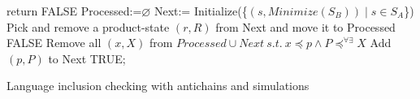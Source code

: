 \begin{algorithm}[H]
	\label{algAntichain}
			{return FALSE\;}
		Processed:=$\varnothing$\;
		Next:= Initialize(\{$(s,Minimize(S_B))\mid s\in S_A$\})\;
		{
			Pick and remove a product-state $(r,R)$ from Next and move it to Processed\;
			{
				{
					\Return FALSE\;}
					{
						{
							{
							 Remove all $(x,X)$ from $Processed\cup Next\ s.t.\ x\preceq p \wedge P\preceq^{\forall \exists}X$\;
							 Add $(p,P)$ to Next\;
							}
						}
				 }
		  }
		}
		\Return TRUE;
	\caption{Language inclusion checking with antichains and simulations}
\end{algorithm}\

